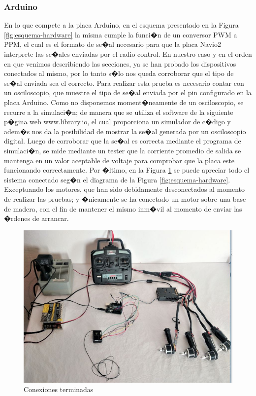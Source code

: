 \subsubsection{Arduino}
En lo que compete a la placa Arduino, en el esquema presentado en la Figura \ref{fig:esquema-hardware} la misma cumple la funci�n de un conversor PWM a PPM, el cual es el formato de se�al necesario para que la placa Navio2 interprete las se�ales enviadas por el radio-control.  En nuestro caso y en el orden en que venimos describiendo las secciones, ya se han probado los dispositivos conectados al mismo, por lo tanto s�lo nos queda corroborar que el tipo de se�al enviada sea el correcto. Para realizar esta prueba es necesario contar con un osciloscopio, que muestre el tipo de se�al enviada por el pin configurado en la placa Arduino. Como no disponemos moment�neamente de un osciloscopio, se recurre a la simulaci�n; de manera que se utiliza el software de la siguiente p�gina web  www.library.io, el cual proporciona un simulador de c�digo y adem�s nos da la posibilidad de mostrar la se�al generada por un osciloscopio digital.   	
Luego de corroborar que la se�al es correcta mediante el programa de simulaci�n, se mide mediante un tester que la corriente promedio de salida se mantenga en un valor aceptable de voltaje para comprobar que la placa este funcionando correctamente.
Por �ltimo, en la Figura \ref{fig:todoconectado} se puede apreciar todo el sistema conectado seg�n el diagrama de la Figura \ref{fig:esquema-hardware}. Exceptuando los motores, que han sido debidamente desconectados al momento de realizar las pruebas; y �nicamente se ha conectado un motor sobre una base de madera, con el fin de mantener el mismo inm�vil al momento de enviar las �rdenes de arrancar. 
\begin{figure}
	\centering
	\includegraphics[width=0.8\linewidth, height=0.2\textheight]{Imagenes/todoConectado}
	\caption{Conexiones terminadas}
	\label{fig:todoconectado}
\end{figure}

